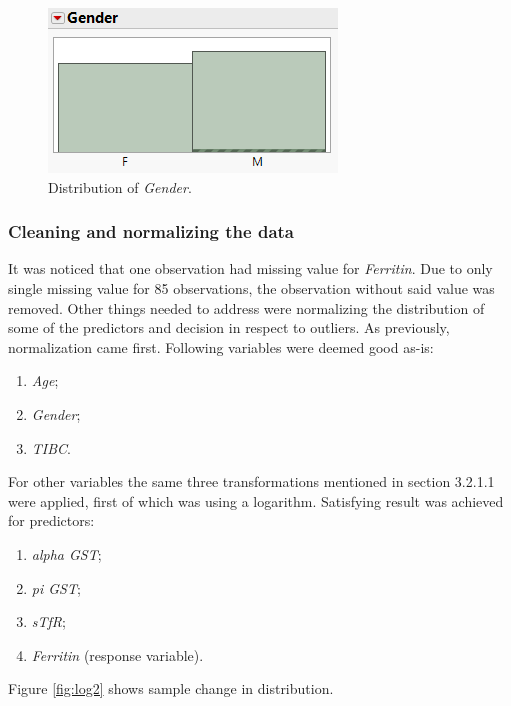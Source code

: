 	\begin{figure}[!ht]
		\centering
		\includegraphics[width=0.6\linewidth]{Rozdzial3/mnf}
		\caption{Distribution of \textit{Gender}.}
		\label{fig:mnf}
	\end{figure}
	
	\subsubsection{Cleaning and normalizing the data}
	
	It was noticed that one observation had missing value for \textit{Ferritin}. Due to only single missing value for 85 observations, the observation without said value was removed. Other things needed to address were normalizing the distribution of some of the predictors and decision in respect to outliers. As previously, normalization came first. Following variables were deemed good as-is:
	
	\begin{enumerate}
		\item \textit{Age};
		\item \textit{Gender};
		\item \textit{TIBC}.
	\end{enumerate}

	For other variables the same three transformations mentioned in section 3.2.1.1 were applied, first of which was using a logarithm. Satisfying result was achieved for predictors:

	\begin{enumerate}
		\item \textit{alpha GST};
		\item \textit{pi GST};
		\item \textit{sTfR};
		\item \textit{Ferritin} (response variable).
	\end{enumerate}

	Figure \ref{fig:log2} shows sample change in distribution.
	
